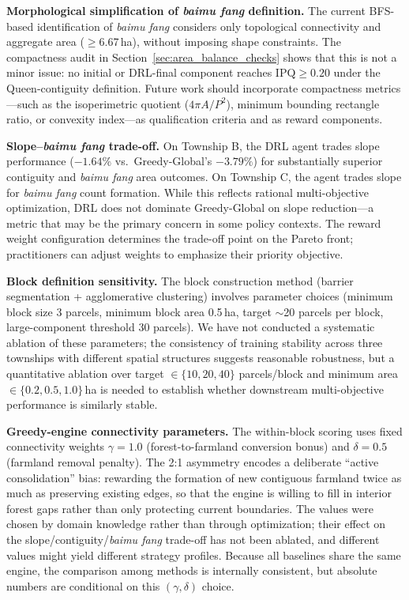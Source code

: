 \documentclass[preprint,12pt]{elsarticle}
\begin{document}
\textbf{Morphological simplification of \textit{baimu fang} definition.} The current BFS-based identification of \textit{baimu fang} considers only topological connectivity and aggregate area ($\geq$6.67\,ha), without imposing shape constraints. The compactness audit in Section~\ref{sec:area_balance_checks} shows that this is not a minor issue: no initial or DRL-final component reaches $\mathrm{IPQ}\geq0.20$ under the Queen-contiguity definition. Future work should incorporate compactness metrics---such as the isoperimetric quotient ($4\pi A / P^2$), minimum bounding rectangle ratio, or convexity index---as qualification criteria and as reward components.

\textbf{Slope--\textit{baimu fang} trade-off.} On Township B, the DRL agent trades slope performance ($-1.64\%$ vs.\ Greedy-Global's $-3.79\%$) for substantially superior contiguity and \textit{baimu fang} area outcomes. On Township C, the agent trades slope for \textit{baimu fang} count formation. While this reflects rational multi-objective optimization, DRL does not dominate Greedy-Global on slope reduction---a metric that may be the primary concern in some policy contexts. The reward weight configuration determines the trade-off point on the Pareto front; practitioners can adjust weights to emphasize their priority objective.

\textbf{Block definition sensitivity.} The block construction method (barrier segmentation + agglomerative clustering) involves parameter choices (minimum block size 3 parcels, minimum block area 0.5\,ha, target $\sim$20 parcels per block, large-component threshold 30 parcels). We have not conducted a systematic ablation of these parameters; the consistency of training stability across three townships with different spatial structures suggests reasonable robustness, but a quantitative ablation over target $\in\{10,20,40\}$ parcels/block and minimum area $\in\{0.2,0.5,1.0\}$\,ha is needed to establish whether downstream multi-objective performance is similarly stable.

\textbf{Greedy-engine connectivity parameters.} The within-block scoring uses fixed connectivity weights $\gamma = 1.0$ (forest-to-farmland conversion bonus) and $\delta = 0.5$ (farmland removal penalty). The 2:1 asymmetry encodes a deliberate ``active consolidation'' bias: rewarding the formation of new contiguous farmland twice as much as preserving existing edges, so that the engine is willing to fill in interior forest gaps rather than only protecting current boundaries. The values were chosen by domain knowledge rather than through optimization; their effect on the slope/contiguity/\textit{baimu fang} trade-off has not been ablated, and different values might yield different strategy profiles. Because all baselines share the same engine, the comparison among methods is internally consistent, but absolute numbers are conditional on this $(\gamma,\delta)$ choice.
\end{document}
